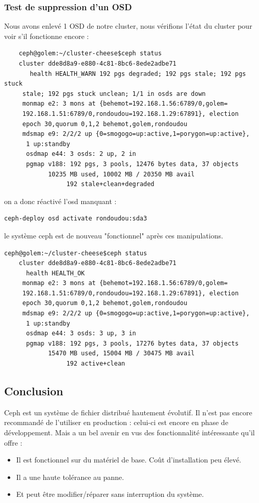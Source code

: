 \documentclass[12pt]{article}
\begin{document}
	\subsubsection{Test de suppression d'un OSD}
	Nous avons enlevé 1 OSD de notre cluster, nous vérifions l'état du cluster pour voir s'il fonctionne encore :
	
	\begin{verbatim}
	ceph@golem:~/cluster-cheese$ceph status     
    cluster dde8d8a9-e880-4c81-8bc6-8ede2adbe71
       health HEALTH_WARN 192 pgs degraded; 192 pgs stale; 192 pgs stuck
     stale; 192 pgs stuck unclean; 1/1 in osds are down  
     monmap e2: 3 mons at {behemot=192.168.1.56:6789/0,golem=
     192.168.1.51:6789/0,rondoudou=192.168.1.29:67891}, election 
     epoch 30,quorum 0,1,2 behemot,golem,rondoudou 
     mdsmap e9: 2/2/2 up {0=smogogo=up:active,1=porygon=up:active},
      1 up:standby
      osdmap e44: 3 osds: 2 up, 2 in 
      pgmap v188: 192 pgs, 3 pools, 12476 bytes data, 37 objects 
            10235 MB used, 10002 MB / 20350 MB avail 
                 192 stale+clean+degraded
\end{verbatim}	 

on a donc réactivé l'osd manquant :
\begin{verbatim}
ceph-deploy osd activate rondoudou:sda3
\end{verbatim}
le système ceph est de nouveau "fonctionnel" après ces manipulations. 
\begin{verbatim}
ceph@golem:~/cluster-cheese$ceph status     
    cluster dde8d8a9-e880-4c81-8bc6-8ede2adbe71
      health HEALTH_OK  
     monmap e2: 3 mons at {behemot=192.168.1.56:6789/0,golem=
     192.168.1.51:6789/0,rondoudou=192.168.1.29:67891}, election 
     epoch 30,quorum 0,1,2 behemot,golem,rondoudou 
     mdsmap e9: 2/2/2 up {0=smogogo=up:active,1=porygon=up:active},
      1 up:standby
      osdmap e44: 3 osds: 3 up, 3 in 
      pgmap v188: 192 pgs, 3 pools, 17276 bytes data, 37 objects 
            15470 MB used, 15004 MB / 30475 MB avail 
                 192 active+clean 
\end{verbatim}
    
	\subsection{Conclusion}
	Ceph est un système de fichier distribué hautement évolutif. Il n'est pas encore recommandé de l'utiliser en production : celui-ci est encore en phase de développement. Mais a un bel avenir en vus des fonctionnalité intéressante qu'il offre :
	\begin{itemize}
	\item Il est fonctionnel sur du matériel de base. Coût d'installation peu élevé.
	\item Il a une haute tolérance au panne.
	\item Et peut être modifier/réparer sans interruption du système.
	\end{itemize}
	
\end{document}
